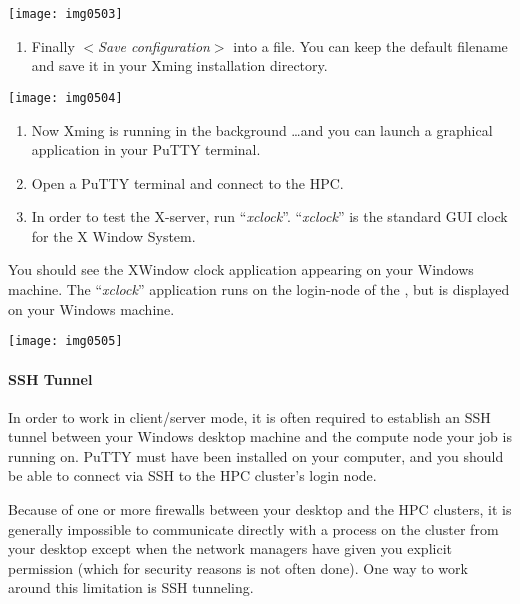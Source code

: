 \texttt{[image: img0503]}

\begin{enumerate}
\item  Finally $<$\textit{Save configuration}$>$ into a file. You can keep the default filename and save it in your Xming installation directory.
\end{enumerate}

\texttt{[image: img0504]}

\begin{enumerate}
\item  Now Xming is running in the background \ldots and you can launch a graphical application in your PuTTY terminal.
\item  Open a PuTTY terminal and connect  to the HPC.
\item  In order to test the X-server, run ``\emph{xclock}''. ``\emph{xclock}'' is the standard GUI clock for the X Window System.
\end{enumerate}

\begin{prompt}
\end{prompt}

You should see the XWindow clock application appearing on your Windows machine.
The ``\emph{xclock}'' application runs on the login-node of the \hpc, but is
displayed on your Windows machine.

\texttt{[image: img0505]}

\paragraph{SSH Tunnel}

In order to work in client/server mode, it is often required to establish an
SSH tunnel between your Windows desktop machine and the compute node your job
is running on.  PuTTY must have been installed on your computer, and you should
be able to connect via SSH to the HPC cluster's login node.

Because of one or more firewalls between your desktop and the HPC clusters, it
is generally impossible to communicate directly with a process on the cluster
from your desktop except when the network managers have given you explicit
permission (which for security reasons is not often done). One way to work
around this limitation is SSH tunneling.

